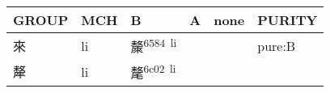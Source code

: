 \documentclass[14pt,a4paper]{scrartcl}
\begin{document}
\begin{longtable}[c]{@{}llllll@{}}
\toprule
\begin{minipage}[b]{0.14\columnwidth}\raggedright\strut
GROUP
\strut\end{minipage} &
\begin{minipage}[b]{0.14\columnwidth}\raggedright\strut
MCH
\strut\end{minipage} &
\begin{minipage}[b]{0.14\columnwidth}\raggedright\strut
B
\strut\end{minipage} &
\begin{minipage}[b]{0.14\columnwidth}\raggedright\strut
A
\strut\end{minipage} &
\begin{minipage}[b]{0.14\columnwidth}\raggedright\strut
none
\strut\end{minipage} &
\begin{minipage}[b]{0.14\columnwidth}\raggedright\strut
PURITY
\strut\end{minipage}\tabularnewline
\midrule
\endhead
\begin{minipage}[t]{0.14\columnwidth}\raggedright\strut
來
\strut\end{minipage} &
\begin{minipage}[t]{0.14\columnwidth}\raggedright\strut
li
\strut\end{minipage} &
\begin{minipage}[t]{0.14\columnwidth}\raggedright\strut
斄\textsuperscript{6584~li}
\strut\end{minipage} &
\begin{minipage}[t]{0.14\columnwidth}\raggedright\strut
\strut\end{minipage} &
\begin{minipage}[t]{0.14\columnwidth}\raggedright\strut
\strut\end{minipage} &
\begin{minipage}[t]{0.14\columnwidth}\raggedright\strut
pure:B
\strut\end{minipage}\tabularnewline
\begin{minipage}[t]{0.14\columnwidth}\raggedright\strut
犛
\strut\end{minipage} &
\begin{minipage}[t]{0.14\columnwidth}\raggedright\strut
li
\strut\end{minipage} &
\begin{minipage}[t]{0.14\columnwidth}\raggedright\strut
氂\textsuperscript{6c02~li}
\strut\end{minipage} &

\end{longtable}
\end{document}
